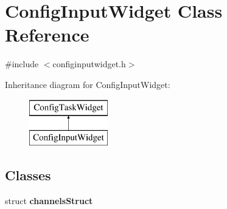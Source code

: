 \hypertarget{class_config_input_widget}{\section{\-Config\-Input\-Widget \-Class \-Reference}
\label{class_config_input_widget}
}


{\ttfamily \#include $<$configinputwidget.\-h$>$}

\-Inheritance diagram for \-Config\-Input\-Widget\-:\begin{figure}[H]
\begin{center}
\leavevmode
\includegraphics[height=2.000000cm]{class_config_input_widget}
\end{center}
\end{figure}
\subsection*{\-Classes}
\begin{DoxyCompactItemize}
\item 
struct {\bfseries channels\-Struct}
\end{DoxyCompactItemize}

